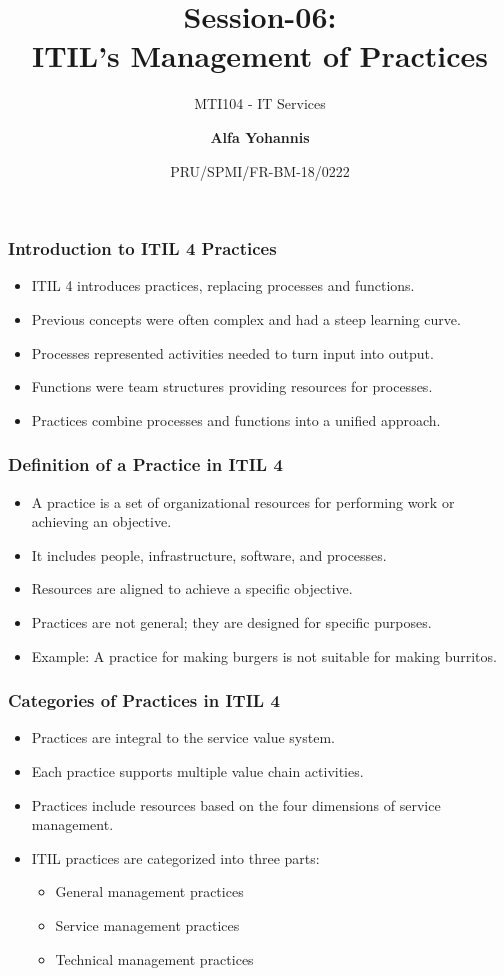 \documentclass[aspectratio=169, table]{beamer}
\subtitle{MTI104 - IT Services}
\title{Session-06:\\\LARGE{ITIL’s Management of Practices \\}}
\date[Serial]{\scriptsize {PRU/SPMI/FR-BM-18/0222}}
\author[Pradita]{\small{\textbf{Alfa Yohannis}}}
\begin{document}
\frame{\titlepage}

\begin{frame}
	\frametitle{Introduction to ITIL 4 Practices}
	
	\begin{itemize}
		\item ITIL 4 introduces practices, replacing processes and functions.
		\item Previous concepts were often complex and had a steep learning curve.
		\item Processes represented activities needed to turn input into output.
		\item Functions were team structures providing resources for processes.
		\item Practices combine processes and functions into a unified approach.
	\end{itemize}
	
\end{frame}

\begin{frame}
	\frametitle{Definition of a Practice in ITIL 4}
	
	\begin{itemize}
		\item A practice is a set of organizational resources for performing work or achieving an objective.
		\item It includes people, infrastructure, software, and processes.
		\item Resources are aligned to achieve a specific objective.
		\item Practices are not general; they are designed for specific purposes.
		\item Example: A practice for making burgers is not suitable for making burritos.
	\end{itemize}
	
\end{frame}

\begin{frame}
	\frametitle{Categories of Practices in ITIL 4}
	
	\begin{itemize}
		\item Practices are integral to the service value system.
		\item Each practice supports multiple value chain activities.
		\item Practices include resources based on the four dimensions of service management.
		\item ITIL practices are categorized into three parts:
		\begin{itemize}
			\item General management practices
			\item Service management practices
			\item Technical management practices
		\end{itemize}
	\end{itemize}
	
\end{frame}
\end{document}
